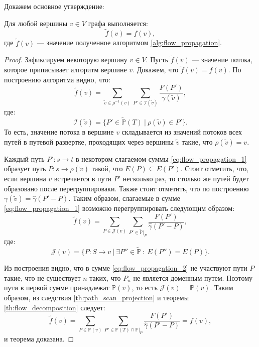 \documentclass[../thesis.tex]{subfiles}
\begin{document}
Докажем основное утверждение:

\begin{theorem} \label{th:flow_propagation}
Для любой вершины $v\in V$ графа выполняется:
\begin{equation}
    \tilde{f}(v) = f(v),
\end{equation}
где $\tilde{f}(v)$ --- значение полученное алгоритмом \ref{alg:flow_propagation}.
\end{theorem}

\begin{proof}
Зафиксируем некоторую вершину $v\in V$.
Пусть $\tilde{f}(v)$ --- значение потока, которое приписывает алгоритм вершине $v$. Докажем, что $\tilde{f}(v)=f(v)$.
По построению алгоритма видно, что:
\begin{equation} \label{eq:flow_propagation_1}
    \tilde{f}(v) =
    \sum_{\tilde{v}\in \rho^{-1}(v)} {
        \sum_{P'\in \mathcal{I}(\tilde{v})} {
            \frac{F(P')}{\gamma(\tilde{v})}
        }
    },
\end{equation}
где:
\begin{equation}
    \mathcal{I}(\tilde{v}) = \big\{P'\in \widetilde{\mathbb{P}}(T)\ |\ \rho(\tilde{v})\in P'\big\}.
\end{equation}
То есть, значение потока в вершине $v$ складывается из значений потоков всех путей в путевой развертке, проходящих через вершины $\tilde{v}$ такие, что $\rho(\tilde{v}) = v$.

Каждый путь $P':s\rightarrow t$ в некотором слагаемом суммы \eqref{eq:flow_propagation_1} образует путь $P:s\rightarrow \rho(\tilde{v})$ такой, что $E(P)\subseteq E(P')$.
Стоит отметить, что, если вершина $v$ встречается в пути $P'$ несколько раз, то столько же путей будет образовано после перегруппироваки.
Также стоит отметить, что по построению $\gamma(\tilde{v})=\hat{\gamma}(P'-P)$.
Таким образом, слагаемые в сумме  \eqref{eq:flow_propagation_1} возможно перегруппировать следующим образом:
\begin{equation} \label{eq:flow_propagation_2}
\tilde{f}(v) = 
    \sum_{P\in \mathcal{J}(v)} {
        \sum_{P'\in \widetilde{\mathbb{P}}|_P} {
            \frac{F(P')}{\hat{\gamma}(P'-P)}
        }
    },
\end{equation}
где:
\begin{equation}
    \mathcal{J}(v) = \big\{P: S\rightarrow v\ | \ \exists P''\in \widetilde{\mathbb{P}}\ : \ E(P'')=E(P)\big\}.
\end{equation}

Из построения видно, что в сумме \eqref{eq:flow_propagation_2} не участвуют пути $P$ такие, что не существует $n$ таких, что $P_n$ не является доменным путем.
Поэтому пути в первой сумме принадлежат $\mathbb{P}(v)$, то есть $\mathcal{J}(v) = \mathbb{P}(v)$.
Таким образом, из следствия \ref{th:path_scan_projection} и теоремы \ref{th:flow_decomposition} следует:
\begin{equation}
\tilde{f}(v) = 
    \sum_{P\in \mathbb{P}(v)}{
        \sum_{
            P'\in \mathbb{P}(T)\cap \mathbb{P}|_P
        }{
            \frac{F(P')}{\hat{\gamma}(P'-P)}
        }
    } = 
f(v),
\end{equation}
и теорема доказана.
\end{proof}
\end{document}
